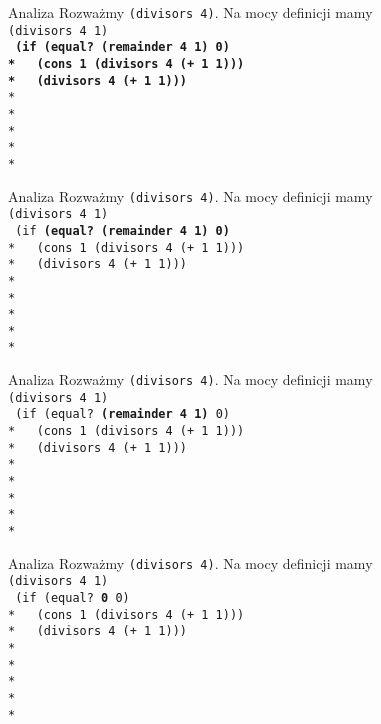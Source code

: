\begin{frame}{Analiza}
  Rozważmy \texttt{(divisors 4)}. Na mocy definicji mamy\\
  \texttt{(divisors 4 1)}\\
  \texttt{
\textbf{(if (equal?\ (remainder 4 1) 0)\\*
\ \ (cons 1 (divisors 4 (+ 1 1)))\\*
\ \ (divisors 4 (+ 1 1)))}\\*
\ \\*
\ \\*
\ \\*
\ \\*
}
\end{frame}

\begin{frame}{Analiza}
  Rozważmy \texttt{(divisors 4)}. Na mocy definicji mamy\\
  \texttt{(divisors 4 1)}\\
  \texttt{
(if \textbf{(equal?\ (remainder 4 1) 0)}\\*
\ \ (cons 1 (divisors 4 (+ 1 1)))\\*
\ \ (divisors 4 (+ 1 1)))\\*
\ \\*
\ \\*
\ \\*
\ \\*
}
\end{frame}

\begin{frame}{Analiza}
  Rozważmy \texttt{(divisors 4)}. Na mocy definicji mamy\\
  \texttt{(divisors 4 1)}\\
  \texttt{
(if (equal?\ \textbf{(remainder 4 1)} 0)\\*
\ \ (cons 1 (divisors 4 (+ 1 1)))\\*
\ \ (divisors 4 (+ 1 1)))\\*
\ \\*
\ \\*
\ \\*
\ \\*
}
\end{frame}

\begin{frame}{Analiza}
  Rozważmy \texttt{(divisors 4)}. Na mocy definicji mamy\\
  \texttt{(divisors 4 1)}\\
  \texttt{
(if (equal?\ \textbf{0} 0)\\*
\ \ (cons 1 (divisors 4 (+ 1 1)))\\*
\ \ (divisors 4 (+ 1 1)))\\*
\ \\*
\ \\*
\ \\*
\ \\*
}
\end{frame}

